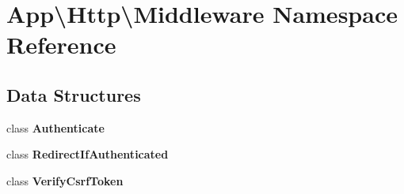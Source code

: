 \section{App\textbackslash{}Http\textbackslash{}Middleware Namespace Reference}
\label{namespace_app_1_1_http_1_1_middleware}
\subsection*{Data Structures}
\begin{DoxyCompactItemize}
\item 
class {\bf Authenticate}
\item 
class {\bf Redirect\+If\+Authenticated}
\item 
class {\bf Verify\+Csrf\+Token}
\end{DoxyCompactItemize}
